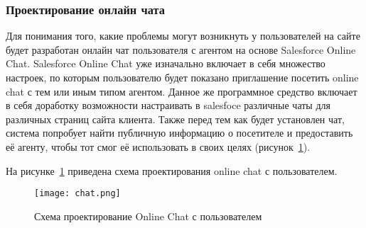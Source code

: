 \subsubsection{Проектирование онлайн чата}
\label{sub:design:chat}

Для понимания того, какие проблемы могут возникнуть у пользователей на сайте будет разработан онлайн чат пользователя с агентом на основе Salesforce Online Chat. Salesforce Online Chat уже изначально включает в себя множество настроек, по которым пользователю будет показано приглашение посетить online chat с тем или иным типом агентом. Данное же программное средство включает в себя доработку возможности настраивать в salesfoce различные чаты для различных страниц сайта клиента. Также перед тем как будет установлен чат, система попробует найти публичную информацию о посетителе и предоставить её агенту, чтобы тот смог её использовать в своих целях (рисунок~\ref{fig:des-chat}).

На рисунке~\ref{fig:des-chat} приведена схема проектирования online chat с пользователем.


\begin{figure}[ht]
\centering
  \texttt{[image: chat.png]}  
  \caption{Схема проектирование Online Chat с пользователем}
	\label{fig:des-chat}
\end{figure} 


